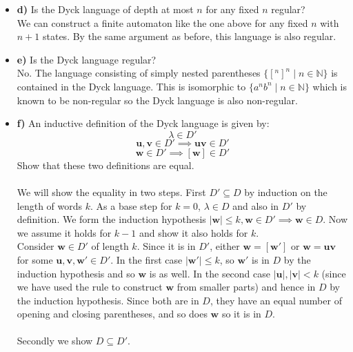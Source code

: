\documentclass[defaultpackages]{simplereport}
\newcommand{\N}{\mathbb{N}}
\begin{document}
\begin{itemize}[label=]
\item \textbf{d)} Is the Dyck language of depth at most $n$ for any fixed $n$
  regular?\\
  We can construct a finite automaton like the one above for any fixed $n$ with
  $n+1$ states. By the same argument as before, this language is also regular.

\item \textbf{e)} Is the Dyck language regular?\\
  No. The language consisting of simply nested parentheses $\{[^n]^n \mid n \in \N\}$ is contained in
  the Dyck language. This is isomorphic to $\{a^nb^n \mid n \in \N\}$ which is
  known to be non-regular so the Dyck language is also non-regular.

\item \textbf{f)} An inductive definition of the Dyck language is given by:
  \[\lambda \in D'\]
  \[\mathbf{u}, \mathbf{v} \in D' \implies \mathbf{uv} \in D'\]
  \[\mathbf{w} \in D' \implies [\mathbf{w}] \in D'\]
  Show that these two definitions are equal.\\\\

  We will show the equality in two steps. First $D' \subseteq D$ by induction on
  the length of words $k$. As a base step for $k=0$, $\lambda \in D$ and also in
  $D'$ by definition. We form the induction hypothesis $\lvert \mathbf{w} \rvert
  \leq k,  \mathbf{w} \in D' \implies \mathbf{w} \in D$. Now we assume it holds for $k-1$ and
  show it also holds for $k$.\\
  Consider $\mathbf{w} \in D'$ of length $k$. Since it is in $D'$, either
  $\mathbf{w} = [\mathbf{w'}]$ or $\mathbf{w} = \mathbf{uv}$ for some
  $\mathbf{u,v, w'} \in D'$. In the first case $\lvert \mathbf{w'} \rvert \leq
  k$, so $\mathbf{w'}$ is in $D$ by the induction hypothesis and so $\mathbf{w}$
  is as well. In the second case $\lvert \mathbf{u} \rvert, \lvert \mathbf{v}
  \rvert < k$ (since we have used the rule to construct $\mathbf{w}$ from
  smaller parts) and hence in $D$ by the induction hypothesis. Since both are in
  $D$, they have an equal number of opening and closing parentheses, and so does
  $\mathbf{w}$ so it is in $D$.\\\\

  Secondly we show $D \subseteq D'$.
\end{itemize}
\end{document}
